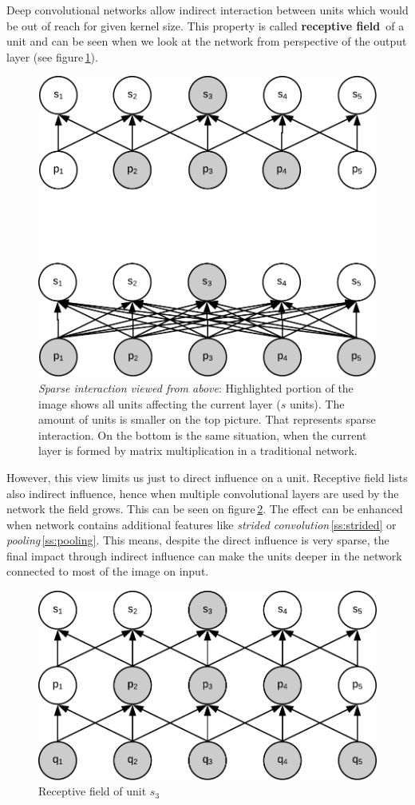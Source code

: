Deep convolutional networks allow indirect interaction between units which would be out of reach for given kernel size. This property is called \textbf{receptive field}\,\cite[p.~337]{deeplearningbook} of a unit and can be seen when we look at the network from perspective of the output layer (see figure\,\ref{fig:sparse_a}).

\begin{figure}[ht]
    \centering
    \includegraphics[width=.6\textwidth]{obrazky-figures/sparse_a.pdf}
    \caption{\textit{Sparse interaction viewed from above}: Highlighted portion of the image shows all units affecting the current layer ($s$ units). The amount of units is smaller on the top picture. That represents sparse interaction. On the bottom is the same situation, when the current layer is formed by matrix multiplication in a traditional network.}\label{fig:sparse_a}
\end{figure}

However, this view limits us just to direct influence on a unit. Receptive field lists also indirect influence, hence when multiple convolutional layers are used by the network the field grows. This can be seen on figure\,\ref{fig:receptive}. The effect can be enhanced when network contains additional features like \textit{strided convolution}\,\ref{ss:strided} or \textit{pooling}\,\ref{ss:pooling}. This means, despite the direct influence is very sparse, the final impact through indirect influence can make the units deeper in the network connected to most of the image on input.

\begin{figure}[ht]
    \centering
    \includegraphics[width=.6\textwidth]{obrazky-figures/receptive.pdf}
    \caption{Receptive field of unit $s_3$}\label{fig:receptive}
\end{figure}

